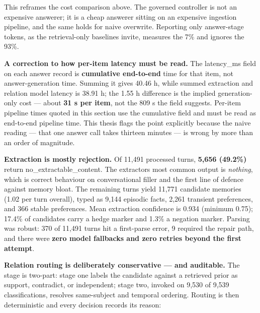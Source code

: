 This reframes the cost comparison above. The governed controller is not
an expensive answerer; it is a cheap answerer sitting on an expensive
ingestion pipeline, and the same holds for naive overwrite. Reporting
only answer-stage tokens, as the retrieval-only baselines invite,
measures the 7\% and ignores the 93\%.

\textbf{A correction to how per-item latency must be read.} The
latency\_ms field on each answer record is \textbf{cumulative
end-to-end} time for that item, not answer-generation time. Summing it
gives 40.46 h, while summed extraction and relation model latency is
38.91 h; the 1.55 h difference is the implied generation-only cost ---
about \textbf{31 s per item}, not the 809 s the field suggests. Per-item
pipeline times quoted in this section use the cumulative field and must
be read as end-to-end pipeline time. This thesis flags the point
explicitly because the naive reading --- that one answer call takes
thirteen minutes --- is wrong by more than an order of magnitude.

\textbf{Extraction is mostly rejection.} Of 11,491 processed turns,
\textbf{5,656 (49.2\%)} return no\_extractable\_content. The
extractor\textquotesingle s most common output is \emph{nothing}, which
is correct behaviour on conversational filler and the first line of
defence against memory bloat. The remaining turns yield 11,771 candidate
memories (1.02 per turn overall), typed as 9,144 episodic facts, 2,261
transient preferences, and 366 stable preferences. Mean extraction
confidence is 0.934 (minimum 0.75); 17.4\% of candidates carry a hedge
marker and 1.3\% a negation marker. Parsing was robust: 370 of 11,491
turns hit a first-parse error, 9 required the repair path, and there
were \textbf{zero model fallbacks and zero retries beyond the first
attempt}.

\textbf{Relation routing is deliberately conservative --- and
auditable.} The stage is two-part: stage one labels the candidate
against a retrieved prior as support, contradict, or independent; stage
two, invoked on 9,530 of 9,539 classifications, resolves same-subject
and temporal ordering. Routing is then deterministic and every decision
records its reason:

